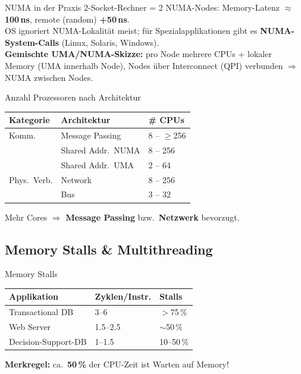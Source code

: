 \documentclass[a4paper, fontsize=7pt]{scrartcl}
\renewcommand*{\arraystretch}{1.5}  %
\begin{document}
\begin{subbox}{NUMA in der Praxis}
2-Socket-Rechner = 2 NUMA-Nodes: Memory-Latenz $\approx$ \textbf{100\,ns},
remote (random) \textbf{+50\,ns}.\\
OS ignoriert NUMA-Lokalität meist; für Spezialapplikationen gibt es
\textbf{NUMA-System-Calls} (Linux, Solaris, Windows).\\
\textbf{Gemischte UMA/NUMA-Skizze:} pro Node mehrere CPUs + lokaler Memory
(UMA innerhalb Node), Nodes über Interconnect (QPI) verbunden
$\Rightarrow$ NUMA zwischen Nodes.
\end{subbox}

\begin{mainbox}{Anzahl Prozessoren nach Architektur}
\renewcommand*{\arraystretch}{1.15}
\begin{tabularx}{\linewidth}{@{}l|X|l@{}}
\textbf{Kategorie} & \textbf{Architektur} & \textbf{\# CPUs} \\
\hline
Komm.\ & Message Passing & 8 -- $\ge$256 \\
              & Shared Addr.\ NUMA & 8 -- 256 \\
              & Shared Addr.\ UMA & 2 -- 64 \\
\hline
Phys.\ Verb.  & Network & 8 -- 256 \\
              & Bus & 3 -- 32 \\
\end{tabularx}
Mehr Cores $\Rightarrow$ \textbf{Message Passing} bzw.\ \textbf{Netzwerk}
bevorzugt.
\end{mainbox}

\subsection{Memory Stalls \& Multithreading}

\begin{mainbox}{Memory Stalls}
\renewcommand*{\arraystretch}{1.15}
\begin{tabularx}{\linewidth}{@{}X|l|l@{}}
\textbf{Applikation} & \textbf{Zyklen/Instr.} & \textbf{Stalls} \\
\hline
Transactional DB & 3--6 & $>$75\,\% \\
Web Server & 1.5--2.5 & $\sim$50\,\% \\
Decision-Support-DB & 1--1.5 & 10--50\,\% \\
\end{tabularx}
\textbf{Merkregel:} ca.\ \textbf{50\,\%} der CPU-Zeit ist Warten auf Memory!
\end{mainbox}
\end{document}
